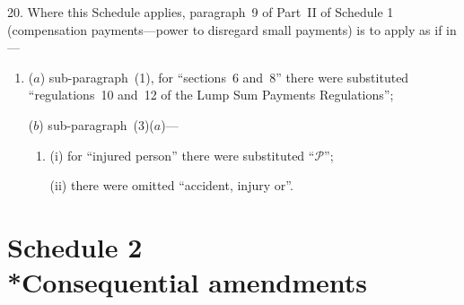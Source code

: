 \documentclass[12pt,a4paper]{article}
\begin{document}
\medskip

20.  Where this Schedule applies, paragraph~9 of Part~II of Schedule 1 (compensation payments---power to disregard small payments) is to apply as if in—
\begin{enumerate}\item[]
($a$) sub-paragraph~(1), for “sections~6 and~8” there were substituted “regulations~10 and~12 of the Lump Sum Payments Regulations”;

($b$) sub-paragraph~(3)($a$)—
\begin{enumerate}\item[]
(i) for “injured person” there were substituted “$\mathcal{P}$”;

(ii) there were omitted “accident, injury or”.
\end{enumerate}
\end{enumerate}

\part[Schedule 2 --- Consequential amendments]{Schedule 2\\*Consequential amendments}

\renewcommand\parthead{--- Schedule 2}
\end{document}
